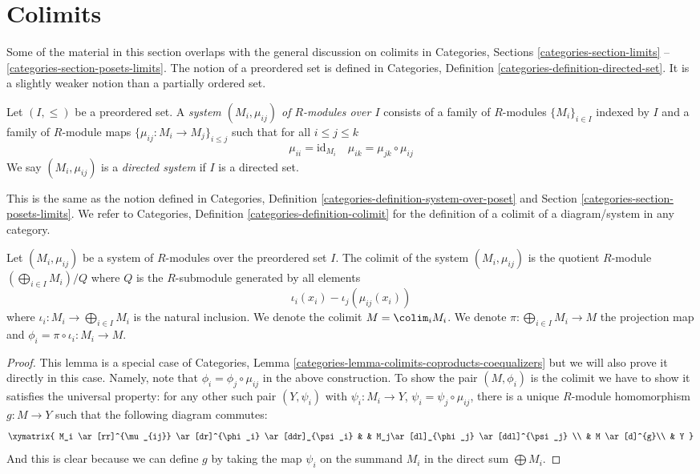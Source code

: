 \section{Colimits}
\label{section-colimits}

\noindent
Some of the material in this section overlaps with the general
discussion on colimits in
Categories, Sections \ref{categories-section-limits} --
\ref{categories-section-posets-limits}.
The notion of a preordered set is defined in
Categories, Definition \ref{categories-definition-directed-set}.
It is a slightly weaker notion than a partially ordered set.

\begin{definition}
\label{definition-directed-system}
Let $(I, \leq)$ be a preordered set.
A {\it system $(M_i, \mu_{ij})$ of $R$-modules over $I$}
consists of a family of $R$-modules $\{M_i\}_{i\in I}$ indexed
by $I$ and a family of $R$-module maps $\{\mu_{ij} : M_i \to M_j\}_{i \leq j}$
such that for all $i \leq j \leq k$
$$
\mu_{ii} = \text{id}_{M_i}\quad
\mu_{ik} = \mu_{jk}\circ \mu_{ij}
$$
We say $(M_i, \mu_{ij})$ is a {\it directed system} if $I$ is a directed set.
\end{definition}

\noindent
This is the same as the notion defined in Categories,
Definition \ref{categories-definition-system-over-poset}
and Section \ref{categories-section-posets-limits}.
We refer to Categories, Definition \ref{categories-definition-colimit}
for the definition of a colimit of a diagram/system in any
category.

\begin{lemma}
\label{lemma-colimit}
Let $(M_i, \mu_{ij})$ be a system of $R$-modules over the preordered set $I$.
The colimit of the system $(M_i, \mu_{ij})$ is the quotient $R$-module
$(\bigoplus_{i\in I} M_i) /Q$ where $Q$ is the
$R$-submodule generated by all elements
$$
\iota_i(x_i) - \iota_j(\mu_{ij}(x_i))
$$
where $\iota_i : M_i \to \bigoplus_{i\in I} M_i$
is the natural inclusion. We denote the colimit
$M = \colim_i M_i$. We denote
$\pi : \bigoplus_{i\in I} M_i \to M$ the
projection map and
$\phi_i = \pi \circ \iota_i : M_i \to M$.
\end{lemma}

\begin{proof}
This lemma is a special case of
Categories, Lemma \ref{categories-lemma-colimits-coproducts-coequalizers}
but we will also prove it directly in this case.
Namely, note that $\phi_i = \phi_j\circ \mu_{ij}$ in the above
construction. To show the pair $(M, \phi_i)$ is the colimit we have
to show it satisfies the universal property: for any other such pair
$(Y, \psi_i)$ with $\psi_i : M_i \to
Y$, $\psi_i = \psi_j\circ \mu_{ij}$, there is a unique $R$-module
homomorphism $g : M \to Y$ such that the
following diagram commutes:
$$
\xymatrix{
M_i \ar[rr]^{\mu_{ij}} \ar[dr]^{\phi_i} \ar[ddr]_{\psi_i} & &
M_j\ar[dl]_{\phi_j} \ar[ddl]^{\psi_j} \\
& M \ar[d]^{g}\\
& Y
}
$$
And this is clear because we can define $g$ by taking the
map $\psi_i$ on the summand $M_i$ in the direct sum
$\bigoplus M_i$.
\end{proof}

